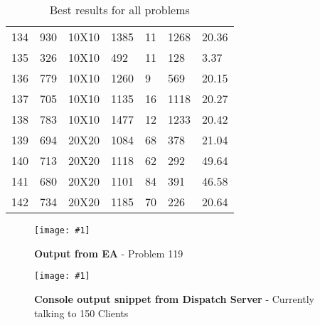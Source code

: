\documentclass[14pt]{acmsiggraph}
\newcommand{\figuremacroF}[4]{
	\begin{figure*}[t] %
		\centering
		\texttt{[image: \#1]}
		\caption[#2]{\textbf{#2} - #3}
		\label{fig:#1}
	\end{figure*}
}
\begin{document}
\begin{table}[h!]
\begin{center}
{\begin{tabular}{||lllllll}
					134 & 930  & 10X10  & \cellcolor[rgb]{0.98,0.91,0.5}1385  & 11  & 1268 & 20.36 \\
					135 & 326  & 10X10  & \cellcolor[rgb]{1,0.9,0.5}492       & 11  & 128  & 3.37  \\
					136 & 779  & 10X10  & \cellcolor[rgb]{1,0.7,0.39}1260     & 9   & 569  & 20.15 \\
					137 & 705  & 10X10  & \cellcolor[rgb]{1,0.72,0.4}1135     & 16  & 1118 & 20.27 \\
					138 & 783  & 10X10  & \cellcolor[rgb]{1,0.21,0.12}1477    & 12  & 1233 & 20.42 \\
					139 & 694  & 20X20  & \cellcolor[rgb]{1,0.8,0.45}1084     & 68  & 378  & 21.04 \\
					140 & 713  & 20X20  & \cellcolor[rgb]{1,0.8,0.45}1118     & 62  & 292  & 49.64 \\
					141 & 680  & 20X20  & \cellcolor[rgb]{1,0.7,0.39}1101     & 84  & 391  & 46.58 \\
					142 & 734  & 20X20  & \cellcolor[rgb]{1,0.71,0.4}1185     & 70  & 226  & 20.64 \\
				\end{tabular}\centering
			}
			
			\caption{Best results for all problems}
			\label{finalResults}
		\end{center}
		
	\end{table}
	
	\figuremacroF
	{genalgrunning}
	{Output from EA}
	{Problem 119}
	{1.0}
	\figuremacroF
	{dispatchcmd}
	{Console output snippet from Dispatch Server}
	{Currently talking to 150 Clients}
	{1.0}
	
\end{document}
